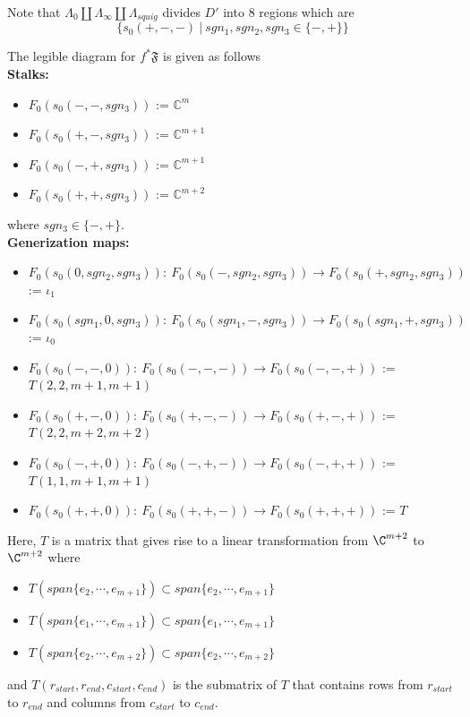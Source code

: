 Note that $\Lambda_0 \coprod \Lambda_\infty \coprod \Lambda_{squig}$ divides $D'$ into $8$ regions which are
\[
	\{s_0(+,-,-) ~|~ sgn_1, sgn_2, sgn_3 \in \{-,+\} \}
\]

The legible diagram for $f^*\mathfrak{F}$ is given as follows\\
\textbf{Stalks:}
\begin{itemize}
\item $F_0(s_0(-,-,sgn_3))$ := $\mathbb{C}^{m}$
\item $F_0(s_0(+,-,sgn_3))$ := $\mathbb{C}^{m+1}$
\item $F_0(s_0(-,+,sgn_3))$ := $\mathbb{C}^{m+1}$
\item $F_0(s_0(+,+,sgn_3))$ := $\mathbb{C}^{m+2}$
\end{itemize}
where $sgn_3 \in \{-, + \}$.\\
\textbf{Generization maps:}
\begin{itemize}
\item $F_0(s_0(0,sgn_2,sgn_3)):~ F_0(s_0(-,sgn_2,sgn_3))\rightarrow F_0(s_0(+,sgn_2,sgn_3))$ := $\iota_1$ 

\item $F_0(s_0(sgn_1,0,sgn_3)):~ F_0(s_0(sgn_1,-,sgn_3))\rightarrow F_0(s_0(sgn_1,+,sgn_3))$ := $\iota_0$ 

\item $F_0(s_0(-,-,0)):~ F_0(s_0(-,-,-))\rightarrow F_0(s_0(-,-,+))$ := $T(2,2,m+1,m+1)$ 

\item $F_0(s_0(+,-,0)):~ F_0(s_0(+,-,-))\rightarrow F_0(s_0(+,-,+))$ := $T(2,2,m+2,m+2)$ 

\item $F_0(s_0(-,+,0)):~ F_0(s_0(-,+,-))\rightarrow F_0(s_0(-,+,+))$ := $T(1,1,m+1,m+1)$ 

\item $F_0(s_0(+,+,0)):~ F_0(s_0(+,+,-))\rightarrow F_0(s_0(+,+,+))$ := $T$ 
\end{itemize}
Here, $T$ is a matrix that gives rise to a linear transformation from $\C^{m+2}$ to $\C^{m+2}$ where
\begin{itemize}
\item $T(span\{ e_2, \cdots, e_{m+1} \}) \subset span\{ e_2, \cdots, e_{m+1} \}$

\item $T(span\{ e_1, \cdots, e_{m+1} \}) \subset span\{ e_1, \cdots, e_{m+1} \}$

\item $T(span\{ e_2, \cdots, e_{m+2} \}) \subset span\{ e_2, \cdots, e_{m+2} \}$
\end{itemize}
and $T(r_{start},r_{end},c_{start},c_{end})$ is the submatrix of $T$ that contains rows from $r_{start}$ to $r_{end}$ and columns from $c_{start}$ to $c_{end}$.\\

